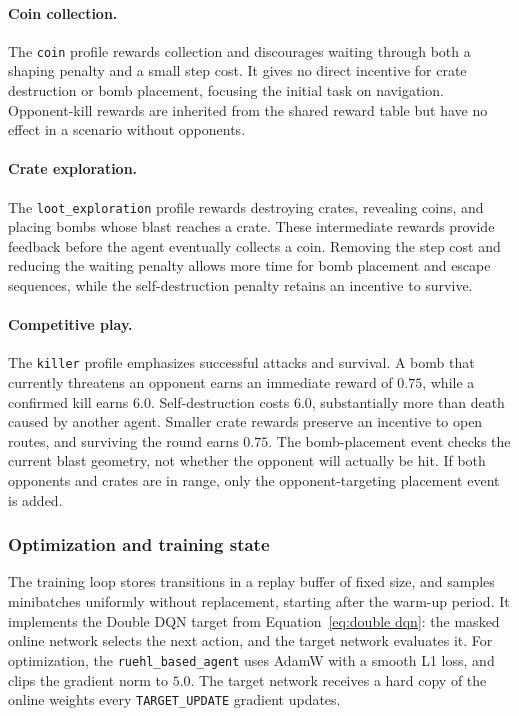 \documentclass[11pt,a4paper]{article}
\begin{document}
\paragraph{Coin collection.}
The \texttt{coin} profile rewards collection and discourages waiting through
both a shaping penalty and a small step cost. It gives no direct incentive
for crate destruction or bomb placement, focusing the initial task on
navigation. Opponent-kill rewards are inherited from the shared reward table
but have no effect in a scenario without opponents.

\paragraph{Crate exploration.}
The \texttt{loot\_exploration} profile rewards destroying crates, revealing
coins, and placing bombs whose blast reaches a crate. These intermediate
rewards provide feedback before the agent eventually collects a coin.
Removing the step cost and reducing the waiting penalty allows more time
for bomb placement and escape sequences, while the self-destruction penalty
retains an incentive to survive.

\paragraph{Competitive play.}
The \texttt{killer} profile emphasizes successful attacks and survival. A
bomb that currently threatens an opponent earns an immediate reward of
$0.75$, while a confirmed kill earns $6.0$. Self-destruction costs $6.0$,
substantially more than death caused by another agent. Smaller crate rewards
preserve an incentive to open routes, and surviving the round earns $0.75$.
The bomb-placement event checks the current blast geometry, not whether the
opponent will actually be hit. If both opponents and crates are in range,
only the opponent-targeting placement event is added.

\subsubsection{Optimization and training state}
The training loop stores transitions in a replay buffer of fixed size, and samples
minibatches uniformly without replacement, starting after the warm-up period.
It implements the Double DQN target from Equation~\eqref{eq:double dqn}:
the masked online network selects the next action, and the target network
evaluates it. 
For optimization, the \texttt{ruehl\_based\_agent} uses AdamW with a smooth L1 loss, and clips the gradient norm
to $5.0$. 
The target network receives a hard copy of the online weights every \texttt{TARGET\_UPDATE} gradient updates.
\end{document}
